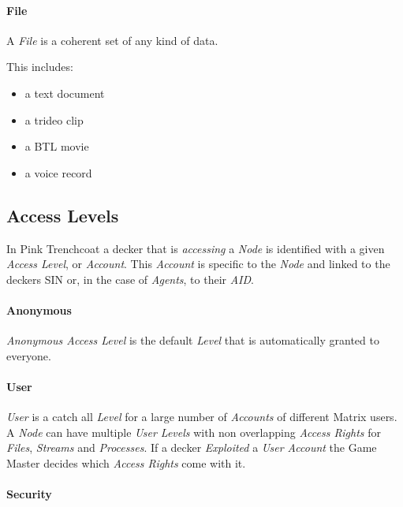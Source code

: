 \paragraph{File}
\label{par:file}

A \emph{File} is a coherent set of any kind of data.

This includes:

\begin{itemize}[parsep=0em]
    \item a text document
    \item a trideo clip
    \item a BTL movie
    \item a voice record
\end{itemize}


\subsection{Access Levels}

In Pink Trenchcoat a decker that is \emph{accessing} a \emph{Node} is identified
with a given \emph{Access Level}, or \emph{Account}. This \emph{Account} is
specific to the \emph{Node} and linked to the deckers SIN or, in the case of
\emph{Agents}, to their \emph{AID}.


\paragraph{Anonymous}

\emph{Anonymous Access Level} is the default \emph{Level} that is automatically
granted to everyone.

\paragraph{User}
\emph{User} is a catch all \emph{Level} for a large number of \emph{Accounts} of
different Matrix users. A \emph{Node} can have multiple \emph{User Levels} with
non overlapping \emph{Access Rights} for \emph{Files}, \emph{Streams} and
\emph{Processes}. If a decker \emph{Exploited} a \emph{User Account} the
Game Master decides which \emph{Access Rights} come with it.

\paragraph{Security}


